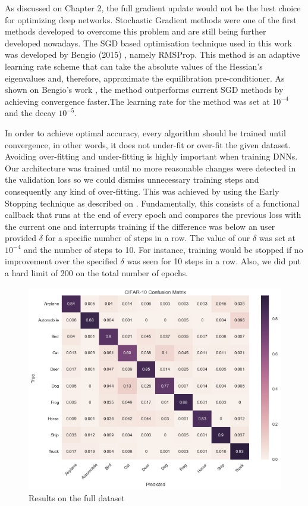 As discussed on Chapter 2, the full gradient update would not be the best choice for optimizing deep networks. Stochastic Gradient methods were one of the first methods developed to overcome this problem and are still being further developed nowadays. The SGD based optimisation technique used in this work was developed by Bengio (2015) \cite{bengiormsprop}, namely RMSProp. This method is an adaptive learning rate scheme that can take the absolute values of the Hessian's eigenvalues and, therefore, approximate the equilibration pre-conditioner. As shown on Bengio's work \cite{bengiormsprop}, the method outperforms current SGD methods by achieving convergence faster.The learning rate for the method was set at $10^{-4}$ and the decay $10^{-5}$.

In order to achieve optimal accuracy, every algorithm should be trained until convergence, in other words, it does not under-fit or over-fit the given dataset. Avoiding over-fitting and under-fitting is highly important when training DNNs. Our architecture was trained until no more reasonable changes were detected in the validation loss so we could dismiss unnecessary training steps and consequently any kind of over-fitting. This was achieved by using the Early Stopping technique as described on \cite{stanford2016}. Fundamentally, this consists of a functional callback that runs at the end of every epoch and compares the previous loss with the current one and interrupts training if the difference was below an user provided $\delta$ for a specific number of steps in a row. The value of our $\delta$ was set at $10^{-4}$ and the number of steps to 10. For instance, training would be stopped if no improvement over the specified $\delta$ was seen for 10 steps in a row. Also, we did put a hard limit of 200 on the total number of epochs.

\begin{figure}[!h]
	\centering
	\includegraphics[scale=0.6]{conf_matrix.png}
	\caption{Results on the full dataset}
	\label{fig:conf_matrix_full}
\end{figure}

